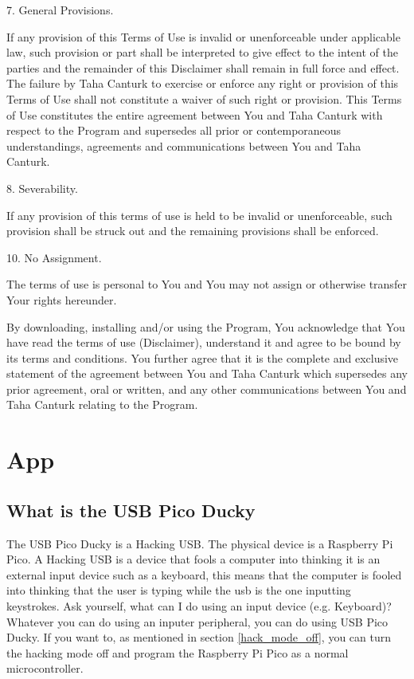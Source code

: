 \documentclass[a4paper,12pt]{article}
\begin{document}
7. General Provisions.

If any provision of this Terms of Use is invalid or unenforceable under applicable law, such provision or part shall be interpreted to give effect to the intent of the parties and the remainder of this Disclaimer shall remain in full force and effect. The failure by Taha Canturk to exercise or enforce any right or provision of this Terms of Use shall not constitute a waiver of such right or provision. This Terms of Use constitutes the entire agreement between You and Taha Canturk with respect to the Program and supersedes all prior or contemporaneous understandings, agreements and communications between You and Taha Canturk.

8. Severability.

If any provision of this terms of use is held to be invalid or unenforceable, such provision shall be struck out and the remaining provisions shall be enforced.

10. No Assignment.

The terms of use is personal to You and You may not assign or otherwise transfer Your rights hereunder.

By downloading, installing and/or using the Program, You acknowledge that You have read the terms of use (Disclaimer), understand it and agree to be bound by its terms and conditions. You further agree that it is the complete and exclusive statement of the agreement between You and Taha Canturk which supersedes any prior agreement, oral or written, and any other communications between You and Taha Canturk relating to the Program.

\newpage

\tableofcontents

\normalsize

\newpage


\section{App}

\subsection{What is the USB Pico Ducky}

The USB Pico Ducky is a Hacking USB. The physical device is a Raspberry Pi Pico. A Hacking USB is a device that fools a computer into thinking it is an external input device such as a keyboard, this means that the computer is fooled into thinking that the user is typing while the usb is the one inputting keystrokes. Ask yourself, what can I do using an input device (e.g. Keyboard)? Whatever you can do using an inputer peripheral, you can do using USB Pico Ducky. If you want to, as mentioned in section \ref{hack_mode_off}, you can turn the hacking mode off and program the Raspberry Pi Pico as a normal microcontroller.
\end{document}
